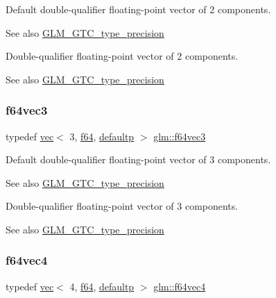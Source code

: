Default double-\/qualifier floating-\/point vector of 2 components. \begin{DoxySeeAlso}{See also}
\mbox{\hyperlink{group__gtc__type__precision}{G\+L\+M\+\_\+\+G\+T\+C\+\_\+type\+\_\+precision}}
\end{DoxySeeAlso}
Double-\/qualifier floating-\/point vector of 2 components. \begin{DoxySeeAlso}{See also}
\mbox{\hyperlink{group__gtc__type__precision}{G\+L\+M\+\_\+\+G\+T\+C\+\_\+type\+\_\+precision}} 
\end{DoxySeeAlso}
\mbox{\label{group__gtc__type__precision_ga659b65d8792f93da76c2da44f06e0b8b}} 
\subsubsection{\texorpdfstring{f64vec3}{f64vec3}}
{\footnotesize\ttfamily typedef \mbox{\hyperlink{structglm_1_1vec}{vec}}$<$ 3, \mbox{\hyperlink{group__gtc__type__precision_ga2bba392e555124b36cde6abba349bab3}{f64}}, \mbox{\hyperlink{namespaceglm_a36ed105b07c7746804d7fdc7cc90ff25a9d21ccd8b5a009ec7eb7677befc3bf51}{defaultp}} $>$ \mbox{\hyperlink{group__gtc__type__precision_ga659b65d8792f93da76c2da44f06e0b8b}{glm\+::f64vec3}}}

Default double-\/qualifier floating-\/point vector of 3 components. \begin{DoxySeeAlso}{See also}
\mbox{\hyperlink{group__gtc__type__precision}{G\+L\+M\+\_\+\+G\+T\+C\+\_\+type\+\_\+precision}}
\end{DoxySeeAlso}
Double-\/qualifier floating-\/point vector of 3 components. \begin{DoxySeeAlso}{See also}
\mbox{\hyperlink{group__gtc__type__precision}{G\+L\+M\+\_\+\+G\+T\+C\+\_\+type\+\_\+precision}} 
\end{DoxySeeAlso}
\mbox{\label{group__gtc__type__precision_ga41fb27973aedd37b7284789f2f997420}} 
\subsubsection{\texorpdfstring{f64vec4}{f64vec4}}
{\footnotesize\ttfamily typedef \mbox{\hyperlink{structglm_1_1vec}{vec}}$<$ 4, \mbox{\hyperlink{group__gtc__type__precision_ga2bba392e555124b36cde6abba349bab3}{f64}}, \mbox{\hyperlink{namespaceglm_a36ed105b07c7746804d7fdc7cc90ff25a9d21ccd8b5a009ec7eb7677befc3bf51}{defaultp}} $>$ \mbox{\hyperlink{group__gtc__type__precision_ga41fb27973aedd37b7284789f2f997420}{glm\+::f64vec4}}}

